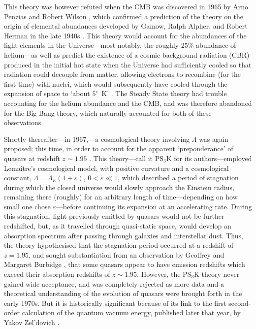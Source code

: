 This theory was however refuted when the CMB was discovered in 1965 by Arno Penzias and Robert Wilson \cite{Dicke1965,Penzias1965}, which confirmed a prediction of the theory on the origin of elemental abundances developed by Gamow, Ralph Alpher, and Robert Herman in the late 1940s \cite{Gamow1946,Alpher1948a,Gamow1948,Alpher1948b,Alpher1950a}. This theory would account for the abundances of the light elements in the Universe---most notably, the roughly 25\% abundance of helium---as well as predict the existence of a cosmic background radiation (CBR) produced in the initial hot state when the Universe had sufficiently cooled so that radiation could decouple from matter, allowing electrons to recombine (for the first time) with nuclei, which would subsequently have cooled through the expansion of space to `about $5^{\circ}$~K' \cite{Alpher1948b}. The Steady State theory had trouble accounting for the helium abundance and the CMB, and was therefore abandoned for the Big Bang theory, which naturally accounted for both of these observations.

Shortly thereafter---in 1967,---a cosmological theory involving $\Lambda$ was again proposed; this time, in order to account for the apparent `preponderance' of quasars at redshift $z\sim1.95$ \cite{Petrosian1967,Shklovsky1967,Kardashev1967}. This theory---call it PS$_3$K for its authors---employed Lema\^{i}tre's cosmological model, with positive curvature and a cosmological constant, $\Lambda=\Lambda_E(1+\varepsilon)$,  $0<\varepsilon\ll1$, which described a period of stagnation during which the closed universe would slowly approach the Einstein radius, remaining there (roughly) for an arbitrary length of time---depending on how small one chose $\varepsilon$---before continuing its expansion at an accelerating rate. During this stagnation, light previously emitted by quasars would not be further redshifted, but, as it travelled through quasi-static space, would develop an absorption spectrum after passing through galaxies and interstellar dust. Thus, the theory hypothesised that the stagnation period occurred at a redshift of $z=1.95$, and sought substantiation from an observation by Geoffrey and Margaret Burbidge \cite{Burbidge1967a,Burbidge1967b}, that some quasars appear to have emission redshifts which exceed their absorption redshifts of $z\sim1.95$. However, the PS$_3$K theory never gained wide acceptance, and was completely rejected as more data and a theoretical understanding of the evolution of quasars were brought forth in the early 1970s. But it is historically significant because of its link to the first second-order calculation of the quantum vacuum energy, published later that year, by Yakov Zel'dovich \cite{Zeldovich1967,Zeldovich1968,Zeldovich2008}.

